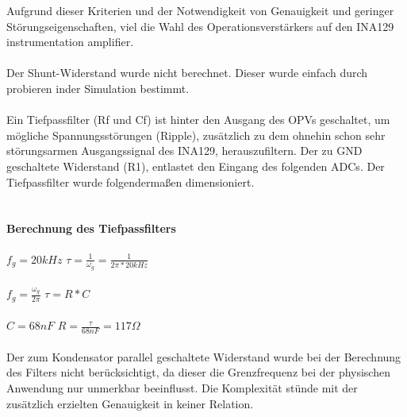 \documentclass[titlepage,12pt,twoside]{article}
\begin{document}
Aufgrund dieser Kriterien und der Notwendigkeit von Genauigkeit und geringer Störungseigenschaften, viel die Wahl des 
Operationsverstärkers auf den INA129 instrumentation amplifier. \\
\\
Der Shunt-Widerstand wurde nicht berechnet. Dieser wurde einfach durch probieren inder Simulation bestimmt. \\
\\
Ein Tiefpassfilter (Rf und Cf) ist hinter den Ausgang des OPVs geschaltet, um mögliche Spannungsstörungen (Ripple), zusätzlich
zu dem ohnehin schon sehr störungsarmen Ausgangssignal des INA129, herauszufiltern. Der zu GND geschaltete Widerstand (R1), 
entlastet den Eingang des folgenden ADCs. Der Tiefpassfilter wurde folgendermaßen dimensioniert. \\
\\
\paragraph{Berechnung des Tiefpassfilters}
\hfill \break
\hfill \break
\hspace*{1cm} $f_{g} = 20 kHz $ \hspace*{1cm} $\tau = \frac{1}{\omega_{g}} = \frac{1}{2\pi * 20 kHz} $ \\
\\
\hspace*{1cm} $f_{g} = \frac{\omega_{g}}{2\pi} $ \hspace*{1.7cm} $\tau = R * C $ \\
\\
\hspace*{4.25cm} $ C = 68 nF $ \hspace*{1cm} $ R = \frac{\tau}{68nF} = 117 \Omega $ \\
\\
Der zum Kondensator parallel geschaltete Widerstand wurde bei der Berechnung des Filters nicht berücksichtigt,
da dieser die Grenzfrequenz bei der physischen Anwendung nur unmerkbar beeinflusst. Die Komplexität stünde mit der 
zusätzlich erzielten Genauigkeit in keiner Relation. \\
\end{document}

